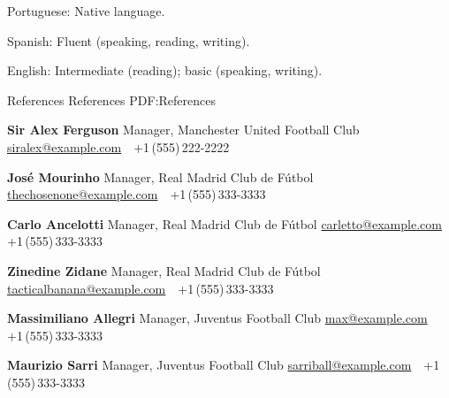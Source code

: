 \documentclass[letterpaper,MMMyyyy,nonstopmode]{simpleresumecv}
\begin{document}
\begin{Body}
\BulletItem
Portuguese: Native language.

\Gap
\BulletItem
Spanish: Fluent (speaking, reading, writing).

\Gap
\BulletItem
English: Intermediate (reading); basic (speaking, writing).

\newpage


\Section
{References}
{References}
{PDF:References}

\BulletItem
\textbf{Sir Alex Ferguson}
\newline
Manager, Manchester United Football Club
\newline
\href{mailto:siralex@example.com}
{siralex@example.com}
\,\SubBulletSymbol\,
+1\,(555)\,222-2222

\BigGap
\BulletItem
\textbf{José Mourinho}
\newline
Manager, Real Madrid Club de Fútbol
\newline
\href{mailto:thechosenone@example.com}
{thechosenone@example.com}
\,\SubBulletSymbol\,
+1\,(555)\,333-3333

\BigGap
\BulletItem
\textbf{Carlo Ancelotti}
\newline
Manager, Real Madrid Club de Fútbol
\newline
\href{mailto:carletto@example.com}
{carletto@example.com}
\,\SubBulletSymbol\,
+1\,(555)\,333-3333

\BigGap
\BulletItem
\textbf{Zinedine Zidane}
\newline
Manager, Real Madrid Club de Fútbol
\newline
\href{mailto:tacticalbanana@example.com}
{tacticalbanana@example.com}
\,\SubBulletSymbol\,
+1\,(555)\,333-3333

\BigGap
\BulletItem
\textbf{Massimiliano Allegri}
\newline
Manager, Juventus Football Club
\newline
\href{mailto:max@example.com}
{max@example.com}
\,\SubBulletSymbol\,
+1\,(555)\,333-3333

\BigGap
\BulletItem
\textbf{Maurizio Sarri}
\newline
Manager, Juventus Football Club
\newline
\href{mailto:alicebobcarol@example.com}
{sarriball@example.com}
\,\SubBulletSymbol\,
+1\,(555)\,333-3333

\end{Body}
\end{document}
